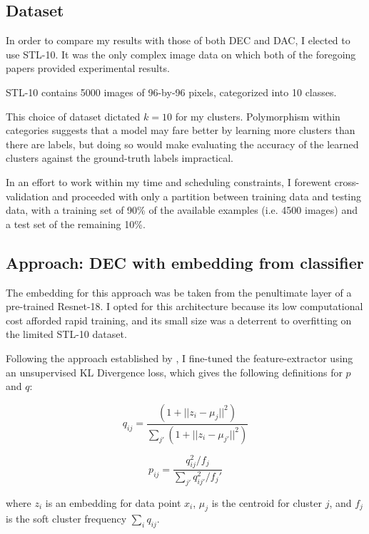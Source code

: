 \subsection{Dataset}

In order to compare my results with those of both DEC and DAC, I elected to use STL-10. It was the only complex image data on which both of the foregoing papers provided experimental results.

STL-10 contains 5000 images of 96-by-96 pixels, categorized into 10 classes.

This choice of dataset dictated $k = 10$ for my clusters. Polymorphism within categories suggests that a model may fare better by learning more clusters than there are labels, but doing so would make evaluating the accuracy of the learned clusters against the ground-truth labels impractical.

In an effort to work within my time and scheduling constraints, I forewent cross-validation and proceeded with only a partition between training data and testing data, with a training set of 90\% of the available examples (i.e. 4500 images) and a test set of the remaining 10\%.

\subsection{Approach: DEC with embedding from classifier} \label{approach1}

The embedding for this approach was be taken from the penultimate layer of a pre-trained Resnet-18. I opted for this architecture because its low computational cost afforded rapid training, and its small size was a deterrent to overfitting on the limited STL-10 dataset. \cite{canziani2016analysis}

Following the approach established by \cite{xie2016unsupervised}, I fine-tuned the feature-extractor using an unsupervised KL Divergence loss, which gives the following definitions for $p$ and $q$:

\begin{equation} \label{eq:q}
q_{ij} = 
\frac
{(1 + ||z_i - \mu_j||^2)}
{\sum_{j'}(1 + ||z_i - \mu_{j'}||^2)}
\end{equation}

\begin{equation} \label{eq:p}
p_{ij} = \frac{q^2_{ij} / f_j}{ \sum_{j'}q^2_{ij'} / f_j' }
\end{equation}

where $z_i$ is an embedding for data point $x_i$, $\mu_j$ is the centroid for cluster $j$, and $f_j$ is the soft cluster frequency $\sum_i q_{ij}$.

